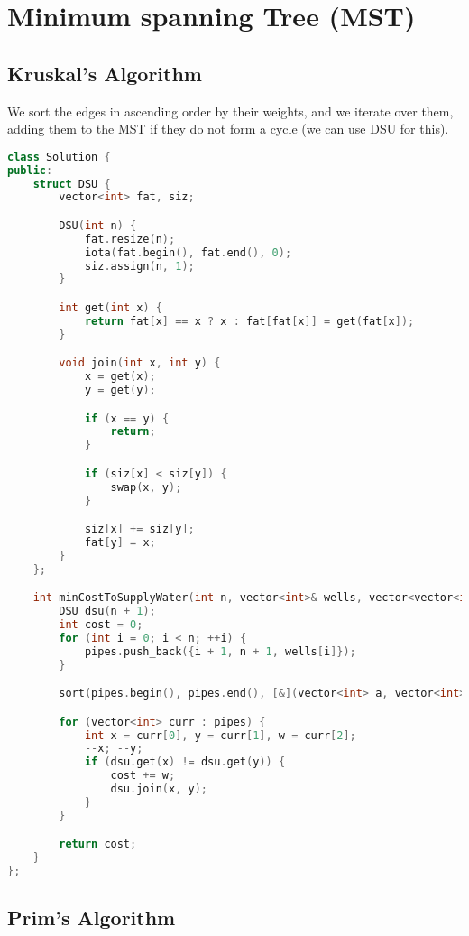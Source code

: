 \documentclass[12pt]{article}
\begin{document}
\section{Minimum spanning Tree (MST)}
\subsection{Kruskal's Algorithm}

We sort the edges in ascending order by their weights, and we iterate over them, adding them to the MST if they do not form a cycle (we can use DSU for this).

\begin{lstlisting}[language=C++]
class Solution {
public:
    struct DSU {
        vector<int> fat, siz;

        DSU(int n) {
            fat.resize(n);
            iota(fat.begin(), fat.end(), 0);
            siz.assign(n, 1);
        }

        int get(int x) {
            return fat[x] == x ? x : fat[fat[x]] = get(fat[x]);
        }

        void join(int x, int y) {
            x = get(x);
            y = get(y);

            if (x == y) {
                return;
            }

            if (siz[x] < siz[y]) {
                swap(x, y);
            }

            siz[x] += siz[y];
            fat[y] = x;
        }
    };

    int minCostToSupplyWater(int n, vector<int>& wells, vector<vector<int>>& pipes) {
        DSU dsu(n + 1);
        int cost = 0;
        for (int i = 0; i < n; ++i) {
            pipes.push_back({i + 1, n + 1, wells[i]});
        }

        sort(pipes.begin(), pipes.end(), [&](vector<int> a, vector<int> b) -> bool {return a[2] < b[2];});

        for (vector<int> curr : pipes) {
            int x = curr[0], y = curr[1], w = curr[2];
            --x; --y;
            if (dsu.get(x) != dsu.get(y)) {
                cost += w;
                dsu.join(x, y);
            }
        }

        return cost;
    }
};
\end{lstlisting}

\subsection{Prim's Algorithm}
\end{document}
